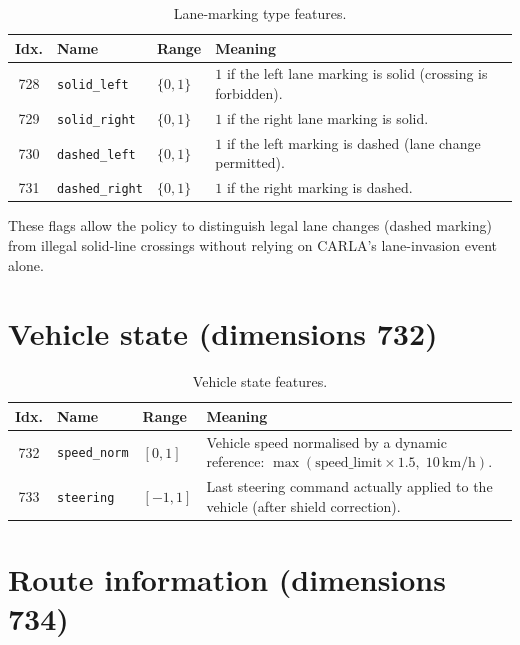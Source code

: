 \begin{table}[H]
  \centering
  \caption{Lane-marking type features.}
  \label{tab:obs-marking}
  \small
  \begin{tabular}{@{}cllp{6cm}@{}}
    \toprule
    \textbf{Idx.} & \textbf{Name} & \textbf{Range} & \textbf{Meaning} \\
    \midrule
    728 & \texttt{solid\_left}   & \(\{0, 1\}\) & \(1\) if the left lane marking is solid
        (crossing is forbidden). \\
    729 & \texttt{solid\_right}  & \(\{0, 1\}\) & \(1\) if the right lane marking is solid. \\
    730 & \texttt{dashed\_left}  & \(\{0, 1\}\) & \(1\) if the left marking is dashed
        (lane change permitted). \\
    731 & \texttt{dashed\_right} & \(\{0, 1\}\) & \(1\) if the right marking is dashed. \\
    \bottomrule
  \end{tabular}
\end{table}

These flags allow the policy to distinguish legal lane changes (dashed marking) from illegal
solid-line crossings without relying on CARLA's lane-invasion event alone.

\section{Vehicle state (dimensions 732)}\label{app:obs-vehicle}

\begin{table}[H]
  \centering
  \caption{Vehicle state features.}
  \label{tab:obs-vehicle}
  \small
  \begin{tabular}{@{}cllp{6cm}@{}}
    \toprule
    \textbf{Idx.} & \textbf{Name} & \textbf{Range} & \textbf{Meaning} \\
    \midrule
    732 & \texttt{speed\_norm} & \([0, 1]\) & Vehicle speed normalised by a dynamic reference:
        \(\max(\text{speed\_limit} \times 1.5,\; 10\,\mathrm{km/h})\). \\
    733 & \texttt{steering}    & \([-1, 1]\) & Last steering command actually applied to the
        vehicle (after shield correction). \\
    \bottomrule
  \end{tabular}
\end{table}

\section{Route information (dimensions 734)}\label{app:obs-route}

